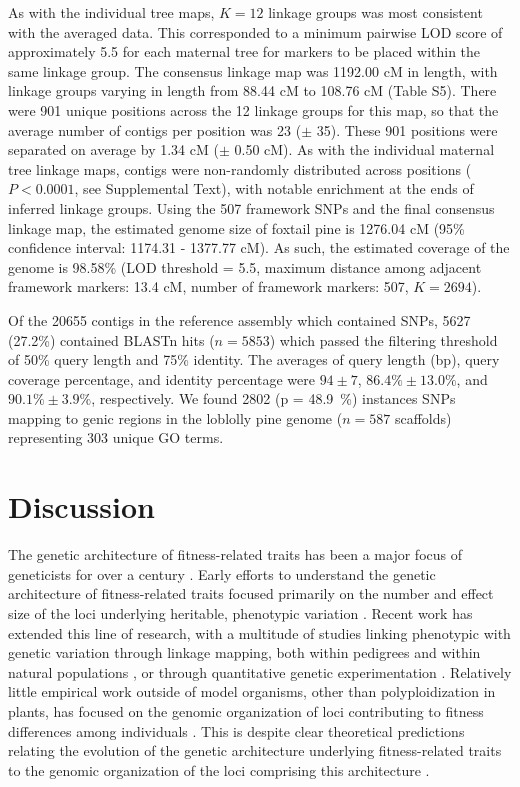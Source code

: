 \documentclass[smallextended]{svjour3}
\begin{document}
As with the individual tree maps, $K = 12$ linkage groups was most consistent
with the averaged data. This corresponded to a minimum pairwise LOD score of
approximately 5.5 for each maternal tree for markers to be placed within the
same linkage group.  The consensus linkage map was 1192.00 cM in length, with
linkage groups varying in length from 88.44 cM to 108.76 cM (Table S5). There
were 901 unique positions across the 12 linkage groups for this map, so that the
average number of contigs per position was 23 ($\pm$ 35). These 901 positions
were separated on average by 1.34 cM ($\pm$ 0.50 cM). As with the individual
maternal tree linkage maps, contigs were non-randomly distributed across
positions ($P < 0.0001$, see Supplemental Text), with notable enrichment at the
ends of inferred linkage groups. Using the 507 framework SNPs and the final
consensus linkage map, the estimated genome size of foxtail pine is 1276.04 cM
(95\% confidence interval: 1174.31 - 1377.77 cM). As such, the estimated
coverage of the genome is 98.58\% (LOD threshold = 5.5, maximum distance among
adjacent framework markers: 13.4 cM, number of framework markers: 507, $K =
2694$).

Of the \num{20655} contigs in the reference assembly which contained SNPs,
\num{5627} (27.2\%) contained BLASTn hits ($n=5853$) which passed the filtering
threshold of 50\% query length and 75\% identity.  The averages of query length
(bp), query coverage percentage, and identity percentage were $94 \pm 7$,
$86.4\% \pm 13.0\%$, and $90.1\% \pm 3.9\%$, respectively. We found 2802 (p =
\SI{48.9}{\percent}) instances SNPs mapping to genic regions in the loblolly 
pine genome ($n = 587$ scaffolds) representing 303 unique GO terms.


\section*{Discussion}

The genetic architecture of fitness-related traits has been a major focus of
geneticists for over a century \citep[reviewed by][]{Ellegren:2008}.  Early
efforts to understand the genetic architecture of fitness-related traits focused
primarily on the number and effect size of the loci underlying heritable,
phenotypic variation \citep{Fisher:1918}.  Recent work has extended this line of
research, with a multitude of studies linking phenotypic with genetic variation through
linkage mapping, both within pedigrees \citep{Mauricio:2001, Neale:2011,
  Ritland:2011} and within natural populations \citep{Ingvarsson:2011,
  Eckert:2013a}, or through quantitative genetic experimentation
\citep{Anderson:2013a, Anderson:2013b, Fournier-Level:2013}. Relatively little
empirical work outside of model organisms, other than polyploidization in
plants, has focused on the genomic organization of loci contributing to fitness
differences among individuals \citep[but see][]{Stevison:2011}. This is despite
clear theoretical predictions relating the evolution of the genetic architecture
underlying fitness-related traits to the genomic organization of the loci
comprising this architecture \citep{Kirkpatrick:2006, Yeaman:2011, Yeaman:2013,
  Akerman:2014}.
\end{document}
